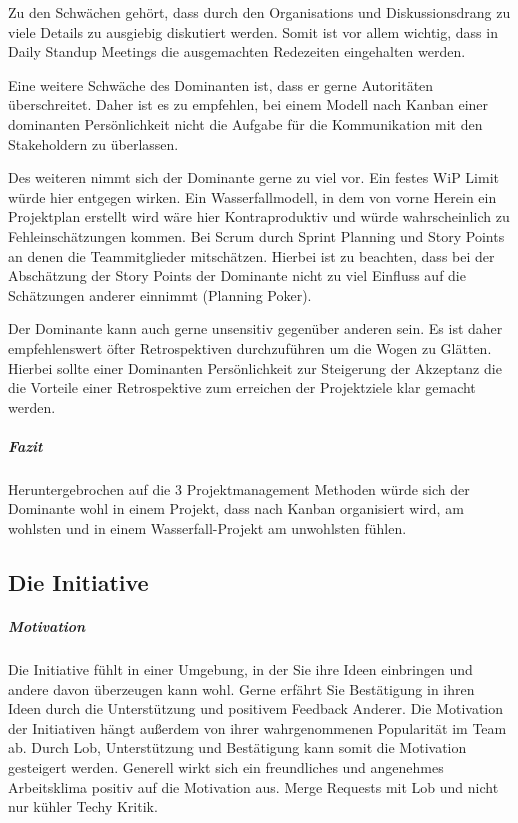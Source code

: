 \documentclass[twocolumn,10pt]{asme2ej}
\begin{document}
Zu den Schwächen gehört, dass durch den Organisations und Diskussionsdrang zu viele Details zu ausgiebig diskutiert werden. Somit ist vor allem wichtig, dass in Daily Standup Meetings die ausgemachten Redezeiten eingehalten werden. 

Eine weitere Schwäche des Dominanten ist, dass er gerne Autoritäten überschreitet. Daher ist es zu empfehlen, bei einem Modell nach Kanban einer dominanten Persönlichkeit nicht die Aufgabe für die Kommunikation mit den Stakeholdern zu überlassen.

Des weiteren nimmt sich der Dominante gerne zu viel vor. Ein festes WiP Limit würde hier entgegen wirken. Ein Wasserfallmodell, in dem von vorne Herein ein Projektplan erstellt wird wäre hier Kontraproduktiv und würde wahrscheinlich zu Fehleinschätzungen kommen. Bei Scrum durch Sprint Planning und Story Points an denen die Teammitglieder mitschätzen. Hierbei ist zu beachten, dass bei der Abschätzung der Story Points der Dominante nicht zu viel Einfluss auf die Schätzungen anderer einnimmt (Planning Poker).

Der Dominante kann auch gerne unsensitiv gegenüber anderen sein. Es ist daher empfehlenswert öfter Retrospektiven durchzuführen um die Wogen zu Glätten. Hierbei sollte einer Dominanten Persönlichkeit zur Steigerung der Akzeptanz die die Vorteile einer Retrospektive zum erreichen der Projektziele klar gemacht werden.

\subparagraph{Fazit}

Heruntergebrochen auf die 3 Projektmanagement Methoden würde sich der Dominante wohl in einem Projekt, dass nach Kanban organisiert wird, am wohlsten und in einem Wasserfall-Projekt am unwohlsten fühlen.

\subsection{Die Initiative}
\subparagraph{Motivation}

Die Initiative fühlt in einer Umgebung, in der Sie ihre Ideen einbringen und andere davon überzeugen kann wohl. Gerne erfährt Sie Bestätigung in ihren Ideen durch die Unterstützung und positivem Feedback Anderer. Die Motivation der Initiativen hängt außerdem von ihrer wahrgenommenen Popularität im Team ab. Durch Lob, Unterstützung und Bestätigung kann somit die Motivation gesteigert werden. Generell wirkt sich ein freundliches und angenehmes Arbeitsklima positiv auf die Motivation aus.  Merge Requests mit Lob und nicht nur kühler Techy Kritik. 
\end{document}
